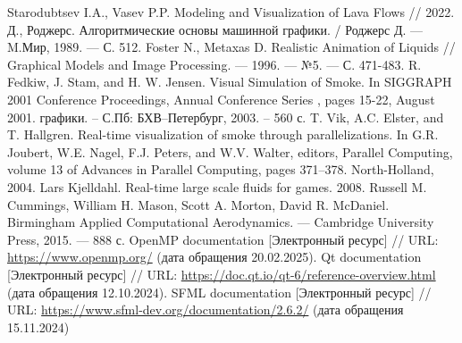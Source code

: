 \begin{thebibliography}{}
	 Starodubtsev I.A., Vasev P.P. Modeling and Visualization of Lava Flows // 2022.
	 Д., Роджерс. Алгоритмические основы машинной графики. / Роджерс Д.
	— M.Мир, 1989. — С. 512. 
	 Foster N., Metaxas D. Realistic Animation of Liquids // Graphical Models and Image Processing. --- 1996. --- №5. --- С. 471-483.
	R. Fedkiw, J. Stam, and H. W. Jensen. Visual Simulation of Smoke. In SIGGRAPH 2001 Conference Proceedings, Annual Conference Series , pages 15-22, August 2001.
	графики. – С.Пб: БХВ–Петербург, 2003. – 560 с.
	 T. Vik, A.C. Elster, and T. Hallgren. Real-time visualization of smoke through parallelizations. In
	G.R. Joubert, W.E. Nagel, F.J. Peters, and W.V. Walter, editors, Parallel Computing, volume 13 of Advances in Parallel Computing, pages 371–378. North-Holland, 2004.
	 Lars Kjelldahl. Real-time large scale fluids for games. 2008.
	 Russell M. Cummings, William H. Mason, Scott A. Morton, David R. McDaniel. Birmingham Applied Computational Aerodynamics. --- Cambridge University Press,  2015. --- 888 с.
	 OpenMP documentation [Электронный ресурс] // URL: \url{https://www.openmp.org/} (дата обращения 20.02.2025).
	 Qt documentation [Электронный ресурс] // URL: \url{https://doc.qt.io/qt-6/reference-overview.html} (дата обращения 12.10.2024).
	 SFML documentation [Электронный ресурс] // URL: \url{https://www.sfml-dev.org/documentation/2.6.2/} (дата обращения 15.11.2024)
\end{thebibliography}
